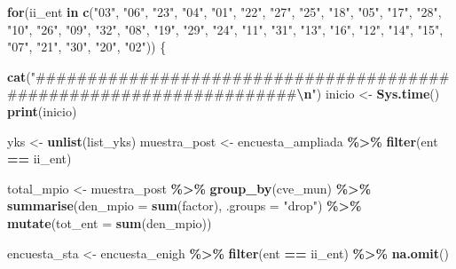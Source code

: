 \documentclass[
  12pt,
]{book}
\newenvironment{Shaded}{\begin{snugshade}}{\end{snugshade}}
\newcommand{\AttributeTok}[1]{\textcolor[rgb]{0.13,0.29,0.53}{#1}}
\newcommand{\ControlFlowTok}[1]{\textcolor[rgb]{0.13,0.29,0.53}{\textbf{#1}}}
\newcommand{\FunctionTok}[1]{\textcolor[rgb]{0.13,0.29,0.53}{\textbf{#1}}}
\newcommand{\NormalTok}[1]{#1}
\newcommand{\OtherTok}[1]{\textcolor[rgb]{0.56,0.35,0.01}{#1}}
\newcommand{\SpecialCharTok}[1]{\textcolor[rgb]{0.81,0.36,0.00}{\textbf{#1}}}
\newcommand{\StringTok}[1]{\textcolor[rgb]{0.31,0.60,0.02}{#1}}
\begin{document}
\begin{Shaded}
\begin{Highlighting}[]
\ControlFlowTok{for}\NormalTok{(ii\_ent }\ControlFlowTok{in} \FunctionTok{c}\NormalTok{(}\StringTok{"03"}\NormalTok{, }\StringTok{"06"}\NormalTok{, }\StringTok{"23"}\NormalTok{, }\StringTok{"04"}\NormalTok{, }\StringTok{"01"}\NormalTok{, }\StringTok{"22"}\NormalTok{, }\StringTok{"27"}\NormalTok{, }\StringTok{"25"}\NormalTok{, }\StringTok{"18"}\NormalTok{,}
                 \StringTok{"05"}\NormalTok{, }\StringTok{"17"}\NormalTok{, }\StringTok{"28"}\NormalTok{, }\StringTok{"10"}\NormalTok{, }\StringTok{"26"}\NormalTok{, }\StringTok{"09"}\NormalTok{, }\StringTok{"32"}\NormalTok{, }\StringTok{"08"}\NormalTok{, }\StringTok{"19"}\NormalTok{, }\StringTok{"29"}\NormalTok{,}
                 \StringTok{"24"}\NormalTok{, }\StringTok{"11"}\NormalTok{, }\StringTok{"31"}\NormalTok{, }\StringTok{"13"}\NormalTok{, }\StringTok{"16"}\NormalTok{, }\StringTok{"12"}\NormalTok{, }\StringTok{"14"}\NormalTok{, }\StringTok{"15"}\NormalTok{, }\StringTok{"07"}\NormalTok{, }\StringTok{"21"}\NormalTok{,}
                 \StringTok{"30"}\NormalTok{, }\StringTok{"20"}\NormalTok{, }\StringTok{"02"}\NormalTok{)) \{}

  \FunctionTok{cat}\NormalTok{(}\StringTok{"\#\#\#\#\#\#\#\#\#\#\#\#\#\#\#\#\#\#\#\#\#\#\#\#\#\#\#\#\#\#\#\#\#\#\#\#\#\#\#\#\#\#\#\#\#\#\#\#\#\#\#\#\#\#\#\#\#\#\#\#\#\#\#\#\#\#\#\#}\SpecialCharTok{\textbackslash{}n}\StringTok{"}\NormalTok{)}
\NormalTok{  inicio }\OtherTok{\textless{}{-}} \FunctionTok{Sys.time}\NormalTok{()}
  \FunctionTok{print}\NormalTok{(inicio)}

\NormalTok{  yks }\OtherTok{\textless{}{-}} \FunctionTok{unlist}\NormalTok{(list\_yks)}
\NormalTok{  muestra\_post }\OtherTok{\textless{}{-}}\NormalTok{ encuesta\_ampliada }\SpecialCharTok{\%\textgreater{}\%} \FunctionTok{filter}\NormalTok{(ent }\SpecialCharTok{==}\NormalTok{ ii\_ent)}
  
\NormalTok{  total\_mpio }\OtherTok{\textless{}{-}}\NormalTok{ muestra\_post }\SpecialCharTok{\%\textgreater{}\%} \FunctionTok{group\_by}\NormalTok{(cve\_mun) }\SpecialCharTok{\%\textgreater{}\%}
    \FunctionTok{summarise}\NormalTok{(}\AttributeTok{den\_mpio =} \FunctionTok{sum}\NormalTok{(factor), }\AttributeTok{.groups =} \StringTok{"drop"}\NormalTok{) }\SpecialCharTok{\%\textgreater{}\%}
    \FunctionTok{mutate}\NormalTok{(}\AttributeTok{tot\_ent =} \FunctionTok{sum}\NormalTok{(den\_mpio))}
  
\NormalTok{  encuesta\_sta }\OtherTok{\textless{}{-}}\NormalTok{ encuesta\_enigh }\SpecialCharTok{\%\textgreater{}\%} \FunctionTok{filter}\NormalTok{(ent }\SpecialCharTok{==}\NormalTok{ ii\_ent) }\SpecialCharTok{\%\textgreater{}\%} \FunctionTok{na.omit}\NormalTok{()}
  

\end{Highlighting}
\end{Shaded}
\end{document}
